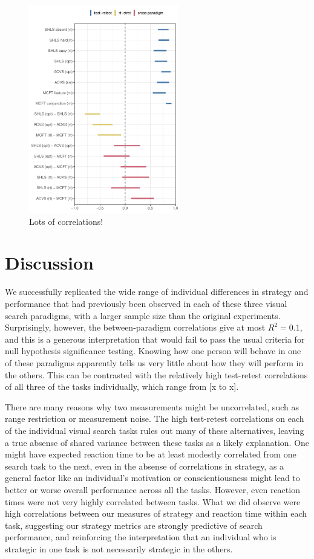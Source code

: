 \documentclass[]{rsos}%
\begin{document}
\begin{figure}
\centering
\includegraphics[width=6.5cm]{../Scripts/scratch/cor_comparison.pdf}
\caption{Lots of correlations!}
\label{fig:all_the_cor}
\end{figure}


\section{Discussion}

We successfully replicated the wide range of individual differences in strategy and performance that had previously been observed in each of these three visual search paradigms, with a larger sample size than the original experiments. Surprisingly, however, the between-paradigm correlations give at most $R^2 = 0.1$, and this is a generous interpretation that would fail to pass the usual criteria for null hypothesis significance testing. Knowing how one person will behave in one of these paradigms apparently tells us very little about how they will perform in the others. This can be contrasted with the relatively high test-retest correlations of all three of the tasks individually, which range from [x to x]. 

There are many reasons why two measurements might be uncorrelated, such as range restriction or measurement noise. The high test-retest correlations on each of the individual visual search tasks rules out many of these alternatives, leaving a true absense of shared variance between these tasks as a likely explanation. One might have expected reaction time to be at least modestly correlated from one search task to the next, even in the absense of correlations in strategy, as a general factor like an individual's motivation or conscientiousness might lead to better or worse overall performance across all the tasks. However, even reaction times were not very highly correlated between tasks. What we did observe were high correlations between our measures of strategy and reaction time within each task, suggesting our strategy metrics are strongly predictive of search performance, and reinforcing the interpretation that an individual who is strategic in one task is not necessarily strategic in the others. 
\end{document}
